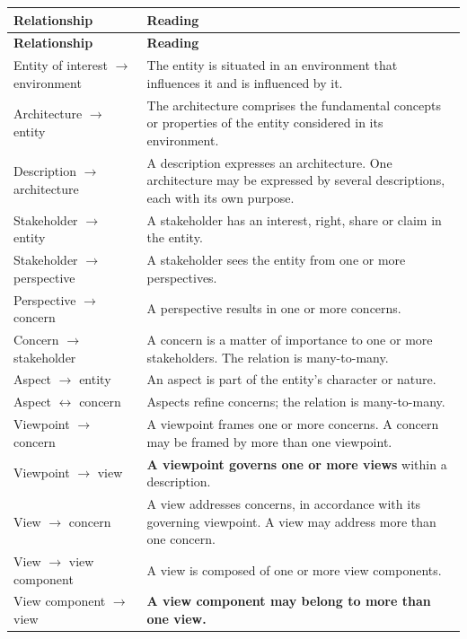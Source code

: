 \documentclass[11pt,a4paper]{report}
\begin{document}
\begin{center}
\small
\begin{longtable}{@{}L{44mm} L{92mm}@{}}
\toprule
\textbf{Relationship} & \textbf{Reading} \\
\midrule
\endfirsthead
\toprule
\textbf{Relationship} & \textbf{Reading} \\
\midrule
\endhead
\bottomrule
\endfoot
Entity of interest $\rightarrow$ environment
  & The entity is situated in an environment that influences it and is influenced
    by it. \\
Architecture $\rightarrow$ entity
  & The architecture comprises the fundamental concepts or properties of the
    entity considered in its environment. \\
Description $\rightarrow$ architecture
  & A description expresses an architecture. One architecture may be expressed by
    several descriptions, each with its own purpose. \\
Stakeholder $\rightarrow$ entity
  & A stakeholder has an interest, right, share or claim in the entity. \\
Stakeholder $\rightarrow$ perspective
  & A stakeholder sees the entity from one or more perspectives. \\
Perspective $\rightarrow$ concern
  & A perspective results in one or more concerns. \\
Concern $\rightarrow$ stakeholder
  & A concern is a matter of importance to one or more stakeholders. The relation
    is many-to-many. \\
Aspect $\rightarrow$ entity
  & An aspect is part of the entity's character or nature. \\
Aspect $\leftrightarrow$ concern
  & Aspects refine concerns; the relation is many-to-many. \\
Viewpoint $\rightarrow$ concern
  & A viewpoint frames one or more concerns. A concern may be framed by more than
    one viewpoint. \\
Viewpoint $\rightarrow$ view
  & \textbf{A viewpoint governs one or more views} within a description. \\
View $\rightarrow$ concern
  & A view addresses concerns, in accordance with its governing viewpoint. A view
    may address more than one concern. \\
View $\rightarrow$ view component
  & A view is composed of one or more view components. \\
View component $\rightarrow$ view
  & \textbf{A view component may belong to more than one view.} \\

\end{longtable}
\end{center}
\end{document}
